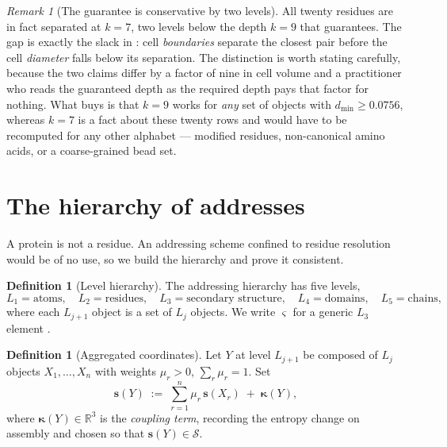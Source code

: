\documentclass[11pt,twocolumn,a4paper]{article}
\theoremstyle{thmstyle}
\theoremstyle{definition}
\newtheorem{definition}[theorem]{Definition}
\theoremstyle{remark}
\newtheorem{remark}[theorem]{Remark}
\newcommand{\R}{\mathbb{R}}
\newcommand{\Sspace}{\mathcal{S}}
\newcommand{\sse}{\varsigma}
\begin{document}
\begin{remark}[The guarantee is conservative by two levels]
\label{rem:guarantee-slack}
All twenty residues are in fact separated at $k = 7$, two levels below
the depth $k = 9$ that  guarantees. The gap is
exactly the slack in : cell \emph{boundaries}
separate the closest pair before the cell \emph{diameter} falls below
its separation. The distinction is worth stating carefully, because
the two claims differ by a factor of nine in cell volume and a
practitioner who reads the guaranteed depth as the required depth pays
that factor for nothing. What  buys is that
$k=9$ works for \emph{any} set of objects with $d_{\min} \geq 0.0756$,
whereas $k = 7$ is a fact about these twenty rows and would have to be
recomputed for any other alphabet --- modified residues, non-canonical
amino acids, or a coarse-grained bead set.
\end{remark}

\section{The hierarchy of addresses}
\label{sec:hierarchy}

A protein is not a residue. An addressing scheme confined to residue
resolution would be of no use, so we build the hierarchy and prove it
consistent.

\begin{definition}[Level hierarchy]
\label{def:hierarchy}
The addressing hierarchy has five levels,
\[
  L_1 = \text{atoms},\quad
  L_2 = \text{residues},\quad
  L_3 = \text{secondary structure},\quad
  L_4 = \text{domains},\quad
  L_5 = \text{chains},
\]
where each $L_{j+1}$ object is a set of $L_j$ objects. We write $\sse$
for a generic $L_3$ element \citep{kabsch1983,branden1999}.
\end{definition}

\begin{definition}[Aggregated coordinates]
\label{def:aggregate}
Let $Y$ at level $L_{j+1}$ be composed of $L_j$ objects
$X_1,\dots,X_n$ with weights $\mu_r > 0$, $\sum_r \mu_r = 1$. Set
\begin{equation}
  \mathbf{s}(Y) \;:=\;
  \sum_{r=1}^n \mu_r\,\mathbf{s}(X_r) \;+\; \boldsymbol\kappa(Y),
  \label{eq:aggregate}
\end{equation}
where $\boldsymbol\kappa(Y) \in \R^3$ is the \emph{coupling term},
recording the entropy change on assembly and chosen so that
$\mathbf{s}(Y) \in \Sspace$.
\end{definition}
\end{document}
